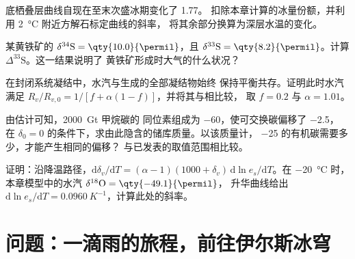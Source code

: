\begin{exercise}[$\star\star$]\label{exo:b3:stable-isotopes:8}
底栖叠层曲线自现在至末次盛冰期变化了 \qty{1.77}{\permil}。
扣除本章计算的冰量份额，并利用
\qty{2}{\celsius} 附近方解石标定曲线的斜率，
将其余部分换算为深层水温的变化。
\end{exercise}

\begin{exercise}[$\star\star$]\label{exo:b3:stable-isotopes:9}
某黄铁矿的 $\delta^{34}\mathrm S = \qty{10.0}{\permil}$，且 $\delta^{33}\mathrm S =
\qty{8.2}{\permil}$。计算 $\Delta^{33}\mathrm S$。这一结果说明了
黄铁矿形成时大气的什么状况？
\end{exercise}

\begin{exercise}[$\star\star\star$]\label{exo:b3:stable-isotopes:10}
在封闭系统凝结中，水汽与生成的全部凝结物始终
保持平衡共存。证明此时水汽满足 $R_v/R_{v,0} = 1/[f +
\alpha(1 - f)]$，并将其与相比较，
取 $f = 0.2$ 与 $\alpha = 1.01$。
\end{exercise}

\begin{exercise}[$\star\star\star$]\label{exo:b3:stable-isotopes:11}
由估计可知，\qty{2000}{Gt} 甲烷碳的
同位素组成为 \qty{-60}{\permil}，使可交换碳偏移了 \qty{-2.5}{\permil}，
在 $\delta_0 = 0$ 的条件下，求由此隐含的储库质量。以该质量计，
\qty{-25}{\permil} 的有机碳需要多少，才能产生相同的偏移？
与已发表的取值范围相比较。
\end{exercise}

\begin{exercise}[$\star\star\star$]\label{exo:b3:stable-isotopes:12}
证明：沿降温路径，$\mathrm d\delta_v/\mathrm dT = (\alpha - 1)(1000 +
\delta_v)\,\mathrm d\ln e_s/\mathrm dT$。在 \qty{-20}{\celsius} 时，本章模型中的水汽
$\delta^{18}\mathrm O = \qty{-49.1}{\permil}$，
升华曲线给出 $\mathrm d\ln e_s/\mathrm dT =
\qty{0.0960}{K^{-1}}$，计算此处的斜率。
\end{exercise}

\section{问题：一滴雨的旅程，前往伊尔斯冰穹}

